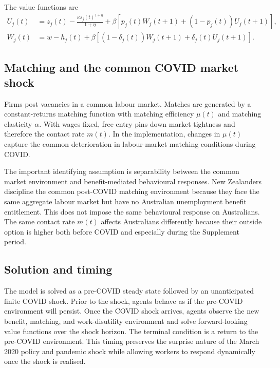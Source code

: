 The value functions are
\begin{align}
    U_j(t)
    &=
    z_j(t)
    -
    \frac{\kappa s_j(t)^{1+\eta}}{1+\eta}
    +
    \beta\left[
        p_j(t) W_j(t+1)
        +
        (1-p_j(t))U_j(t+1)
    \right],
    \label{eq:U_14}
    \\
    W_j(t)
    &=
    w-h_j(t)
    +
    \beta\left[
        (1-\delta_j(t))W_j(t+1)
        +
        \delta_j(t)U_j(t+1)
    \right].
    \label{eq:W_14}
\end{align}

\subsection{Matching and the common COVID market shock}

Firms post vacancies in a common labour market. Matches are generated by a constant-returns matching function with matching efficiency $\mu(t)$ and matching elasticity $\alpha$. With wages fixed, free entry pins down market tightness and therefore the contact rate $m(t)$. In the implementation, changes in $\mu(t)$ capture the common deterioration in labour-market matching conditions during COVID.

The important identifying assumption is separability between the common market environment and benefit-mediated behavioural responses. New Zealanders discipline the common post-COVID matching environment because they face the same aggregate labour market but have no Australian unemployment benefit entitlement. This does not impose the same behavioural response on Australians. The same contact rate $m(t)$ affects Australians differently because their outside option is higher both before COVID and especially during the Supplement period.

\subsection{Solution and timing}

The model is solved as a pre-COVID steady state followed by an unanticipated finite COVID shock. Prior to the shock, agents behave as if the pre-COVID environment will persist. Once the COVID shock arrives, agents observe the new benefit, matching, and work-disutility environment and solve forward-looking value functions over the shock horizon. The terminal condition is a return to the pre-COVID environment. This timing preserves the surprise nature of the March 2020 policy and pandemic shock while allowing workers to respond dynamically once the shock is realised.

